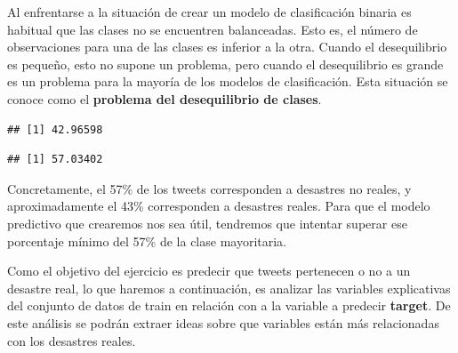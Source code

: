 \documentclass[]{article}
\newenvironment{Shaded}{\begin{snugshade}}{\end{snugshade}}
\newcommand{\DecValTok}[1]{\textcolor[rgb]{0.00,0.00,0.81}{#1}}
\newcommand{\KeywordTok}[1]{\textcolor[rgb]{0.13,0.29,0.53}{\textbf{#1}}}
\newcommand{\NormalTok}[1]{#1}
\newcommand{\OperatorTok}[1]{\textcolor[rgb]{0.81,0.36,0.00}{\textbf{#1}}}
\newcommand{\StringTok}[1]{\textcolor[rgb]{0.31,0.60,0.02}{#1}}
\begin{document}
\begin{tcolorbox}
	Al enfrentarse a la situación de crear un modelo de clasificación binaria es habitual que las clases no se encuentren balanceadas. Esto es, el número de observaciones para una de las clases es inferior a la otra. Cuando el desequilibrio es pequeño, esto no supone un problema, pero cuando el desequilibrio es grande es un problema para la mayoría de los modelos de clasificación. Esta situación se conoce como el \textbf{problema del desequilibrio de clases}.
\end{tcolorbox}

\vspace{3mm}

\begin{Shaded}
\end{Shaded}

\begin{verbatim}
## [1] 42.96598
\end{verbatim}

\begin{Shaded}
\end{Shaded}

\begin{verbatim}
## [1] 57.03402
\end{verbatim}

Concretamente, el 57\% de los tweets corresponden a desastres no reales, y aproximadamente el 43\% corresponden a desastres reales. Para que el modelo predictivo que crearemos nos sea útil, tendremos que intentar superar ese porcentaje mínimo del 57\% de la clase mayoritaria.

Como el objetivo del ejercicio es predecir que tweets pertenecen o no a un desastre real, lo que haremos a continuación, es analizar las variables explicativas del conjunto de datos de train en relación con a la variable a predecir \textbf{target}. De este análisis se podrán extraer ideas sobre que variables están más relacionadas con los desastres reales.
\end{document}
